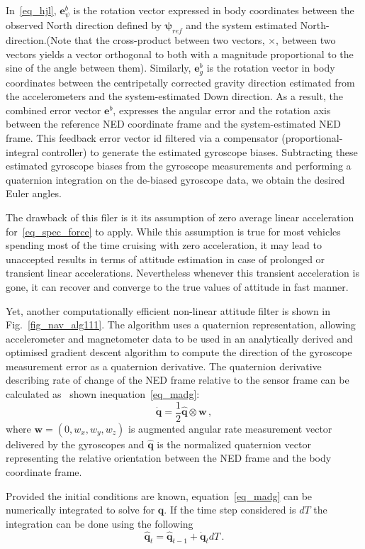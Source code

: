 \documentclass[journal]{IEEEtran}
\begin{document}
In~\eqref{eq_hjl}, $\boldsymbol{e}_\psi^b$  is the rotation vector expressed in body coordinates between the observed North direction defined by $\boldsymbol{\psi}_{ref}$ and the system estimated North-direction.(Note that the cross-product between two vectors, $\times$, between two vectors yields a vector orthogonal to both with a magnitude proportional to the sine of the angle between them).
Similarly, $\boldsymbol{e}_g^b$ is the rotation vector in body coordinates between the centripetally corrected gravity direction estimated from the accelerometers and the system-estimated Down direction. As a result, the combined error vector $\boldsymbol{e}^b$, expresses the angular error and the rotation axis between the reference NED coordinate frame and the system-estimated NED frame. This feedback error vector id filtered via a compensator (proportional-integral controller) to generate the estimated gyroscope biases. Subtracting these estimated gyroscope biases from the gyroscope measurements and performing a quaternion integration on the de-biased gyroscope data, we obtain the desired Euler angles.\par
The drawback of this filer is it its assumption of zero average linear acceleration for~\eqref{eq_spec_force} to apply. While this assumption is true for most vehicles spending most of the time cruising with zero acceleration, it may lead to unaccepted results in terms of attitude estimation in case of prolonged or transient linear accelerations. Nevertheless whenever this transient acceleration is gone, it can recover and converge to the true values of attitude in fast manner.\par
Yet, another computationally efficient non-linear attitude filter is shown in Fig.~\ref{fig_nav_alg111}. The algorithm uses a quaternion
representation, allowing accelerometer and magnetometer data to be used in an analytically derived and optimised gradient
descent algorithm to compute the direction of the gyroscope measurement error as a quaternion derivative. The quaternion
derivative describing rate of change of the NED frame relative to the sensor frame can be calculated as~\cite{cooke1992npsnet} shown inequation~\eqref{eq_madg}:
\begin{equation}\label{eq_madg}
    \dot{\boldsymbol{q}}= \frac{1}{2}\hat{\boldsymbol{q}}\otimes\boldsymbol{w}\,,
\end{equation}
where $\boldsymbol{w}=
(0,w_x,w_y,w_z)$ is augmented  angular rate measurement vector delivered by the gyroscopes and $\hat{\boldsymbol{q}}$ is the normalized quaternion vector representing the relative orientation between the NED frame and the body coordinate frame.\par 
Provided the initial conditions are known, equation~\eqref{eq_madg} can be numerically integrated to solve for $\boldsymbol{q}$. If the time step considered is $dT$ the integration can be done using the following
\begin{equation}\label{eq_madg2}
  \hat{\boldsymbol{q}}_t=   \hat{\boldsymbol{q}}_{t-1}+ \dot{\boldsymbol{q}}_tdT\,.
\end{equation}
\end{document}
